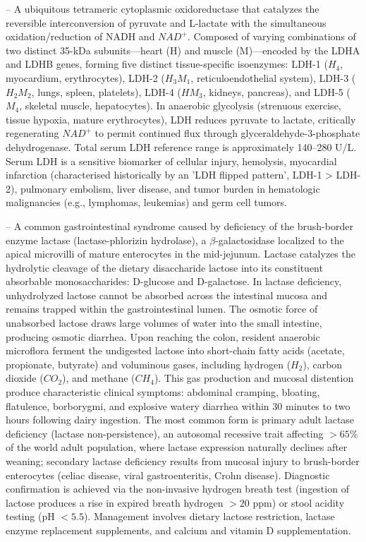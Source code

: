-- A ubiquitous tetrameric cytoplasmic oxidoreductase that catalyzes the reversible interconversion of pyruvate and L-lactate with the simultaneous oxidation/reduction of NADH and $NAD^+$. Composed of varying combinations of two distinct 35-kDa subunits---heart (H) and muscle (M)---encoded by the LDHA and LDHB genes, forming five distinct tissue-specific isoenzymes: LDH-1 ($H_4$, myocardium, erythrocytes), LDH-2 ($H_3M_1$, reticuloendothelial system), LDH-3 ($H_2M_2$, lungs, spleen, platelets), LDH-4 ($HM_3$, kidneys, pancreas), and LDH-5 ($M_4$, skeletal muscle, hepatocytes). In anaerobic glycolysis (strenuous exercise, tissue hypoxia, mature erythrocytes), LDH reduces pyruvate to lactate, critically regenerating $NAD^+$ to permit continued flux through glyceraldehyde-3-phosphate dehydrogenase. Total serum LDH reference range is approximately 140--280 U/L. Serum LDH is a sensitive biomarker of cellular injury, hemolysis, myocardial infarction (characterised historically by an 'LDH flipped pattern', LDH-1 > LDH-2), pulmonary embolism, liver disease, and tumor burden in hematologic malignancies (e.g., lymphomas, leukemias) and germ cell tumors.

-- A common gastrointestinal syndrome caused by deficiency of the brush-border enzyme lactase (lactase-phlorizin hydrolase), a $\beta$-galactosidase localized to the apical microvilli of mature enterocytes in the mid-jejunum. Lactase catalyzes the hydrolytic cleavage of the dietary disaccharide lactose into its constituent absorbable monosaccharides: D-glucose and D-galactose. In lactase deficiency, unhydrolyzed lactose cannot be absorbed across the intestinal mucosa and remains trapped within the gastrointestinal lumen. The osmotic force of unabsorbed lactose draws large volumes of water into the small intestine, producing osmotic diarrhea. Upon reaching the colon, resident anaerobic microflora ferment the undigested lactose into short-chain fatty acids (acetate, propionate, butyrate) and voluminous gases, including hydrogen ($H_2$), carbon dioxide ($CO_2$), and methane ($CH_4$). This gas production and mucosal distention produce characteristic clinical symptoms: abdominal cramping, bloating, flatulence, borborygmi, and explosive watery diarrhea within 30 minutes to two hours following dairy ingestion. The most common form is primary adult lactase deficiency (lactase non-persistence), an autosomal recessive trait affecting $>65\%$ of the world adult population, where lactase expression naturally declines after weaning; secondary lactase deficiency results from mucosal injury to brush-border enterocytes (celiac disease, viral gastroenteritis, Crohn disease). Diagnostic confirmation is achieved via the non-invasive hydrogen breath test (ingestion of lactose produces a rise in expired breath hydrogen $>20$ ppm) or stool acidity testing (pH $<5.5$). Management involves dietary lactose restriction, lactase enzyme replacement supplements, and calcium and vitamin D supplementation.

